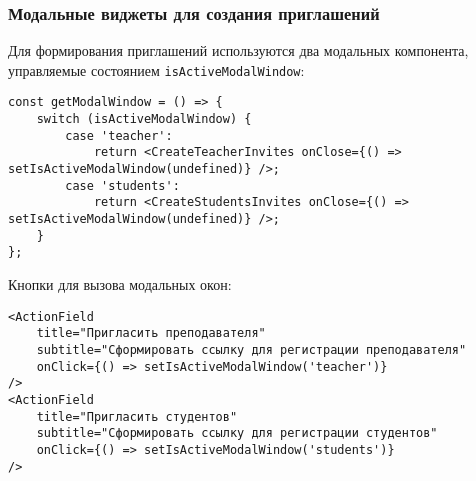 \subsubsection{Модальные виджеты для создания приглашений}
Для формирования приглашений используются два модальных компонента, управляемые состоянием \texttt{isActiveModalWindow}:
\begin{lstlisting}[caption={Выбор модального окна приглашения}]
const getModalWindow = () => {
    switch (isActiveModalWindow) {
        case 'teacher':
            return <CreateTeacherInvites onClose={() => setIsActiveModalWindow(undefined)} />;
        case 'students':
            return <CreateStudentsInvites onClose={() => setIsActiveModalWindow(undefined)} />;
    }
};
\end{lstlisting}

Кнопки для вызова модальных окон:
\begin{lstlisting}[caption={Кнопки вызова модальных приглашений}]
<ActionField
    title="Пригласить преподавателя"
    subtitle="Сформировать ссылку для регистрации преподавателя"
    onClick={() => setIsActiveModalWindow('teacher')}
/>
<ActionField
    title="Пригласить студентов"
    subtitle="Сформировать ссылку для регистрации студентов"
    onClick={() => setIsActiveModalWindow('students')}
/>
\end{lstlisting}

